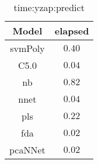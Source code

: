 \begin{table}[!ht]
	\centering
	\begin{tabular}{|c|c|}
		\hline
		Model & elapsed \\ \hline
		svmPoly & $0.40$ \\ \hline
		C5.0 & $0.04$ \\ \hline
		nb & $0.82$ \\ \hline
		nnet & $0.04$ \\ \hline
		pls & $0.22$ \\ \hline
		fda & $0.02$ \\ \hline
		pcaNNet & $0.02$ \\ \hline
	\end{tabular}
	\caption{time:yzap:predict}
	\label{tab:time:yzap:predict}
\end{table}
